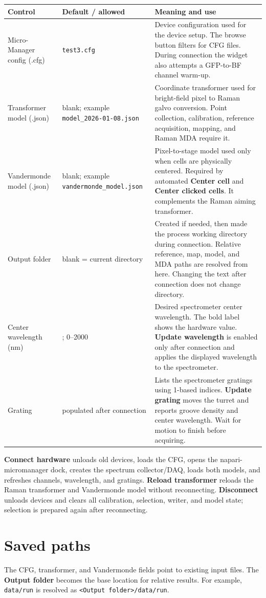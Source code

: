 \documentclass[11pt,oneside]{report}
\makeatletter
\newcommand{\ui}[1]{\textbf{#1}}
\newcommand{\code}[1]{\texttt{#1}}
\newcommand{\fieldtable}{\begin{longtable}{@{}>{\raggedright\arraybackslash}p{0.25\textwidth}>{\raggedright\arraybackslash}p{0.18\textwidth}>{\raggedright\arraybackslash}p{0.50\textwidth}@{}}\toprule\textbf{Control} & \textbf{Default / allowed} & \textbf{Meaning and use}\\\midrule\endhead}
\newcommand{\finishfieldtable}{\bottomrule\end{longtable}}
\makeatother
\begin{document}
\fieldtable
Micro-Manager config (.cfg) & \code{test3.cfg} & Device configuration used for
the device setup. The browse button filters for CFG files. During
connection the widget also attempts a GFP-to-BF channel warm-up.\\
Transformer model (.json) & blank; example \code{model\_2026-01-08.json} &
Coordinate transformer used for bright-field pixel to Raman galvo conversion.
Point collection, calibration, reference acquisition, mapping, and Raman MDA require it.\\
Vandermonde model (.json) & blank; example \code{vandermonde\_model.json} &
Pixel-to-stage model used only when cells are physically centered. Required by
automated \ui{Center cell} and \ui{Center clicked cells}. It complements the Raman
aiming transformer.\\
Output folder & blank = current directory & Created if needed, then made the process
working directory during connection. Relative reference, map, model, and MDA paths
are resolved from here. Changing the text after connection does not change directory.\\
Center wavelength (nm) & 785.00; 0--2000 & Desired spectrometer center wavelength.
The bold label shows the hardware value. \ui{Update wavelength} is enabled only after
connection and applies the displayed wavelength to the spectrometer.\\
Grating & populated after connection & Lists the spectrometer gratings using 1-based
indices. \ui{Update grating} moves the turret and reports groove density and center
wavelength. Wait for motion to finish before acquiring.\\
\finishfieldtable

\ui{Connect hardware} unloads old devices, loads the CFG, opens the
napari-micromanager dock, creates the spectrum collector/DAQ, loads both models,
and refreshes channels, wavelength, and gratings. \ui{Reload transformer} reloads
the Raman transformer and Vandermonde model without reconnecting. \ui{Disconnect}
unloads devices and clears all calibration, selection, writer, and model state;
selection is prepared again after reconnecting.

\section*{Saved paths}
The CFG, transformer, and Vandermonde fields point to existing input files. The
\ui{Output folder} becomes the base location for relative results. For example,
\code{data/run} is resolved as \code{<Output folder>/data/run}.
\end{document}
